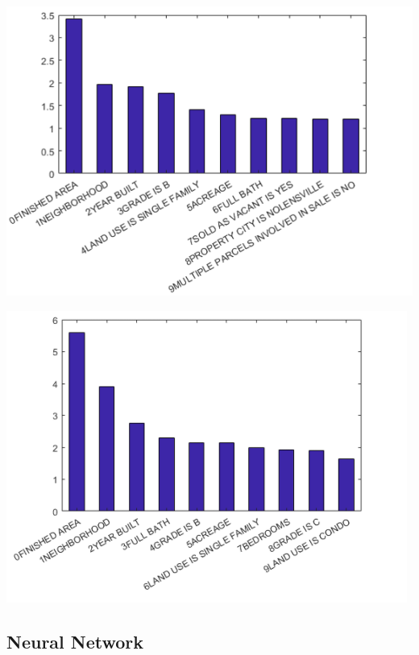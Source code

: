 \documentclass[10pt]{article}
\begin{document}
\begin{multicols}{2}
		\begin{center}
		\captionsetup{type=figure}
			\includegraphics[scale=0.60]{Images/BestFeaturesRegression} \\
			\label{fig:r_best_features}
		\end{center}

		\begin{center}
		\captionsetup{type=figure}
			\includegraphics[scale=0.60]{Images/BestFeaturesClassification} \\
			\label{fig:c_best_features}
		\end{center}

		\subsection{Neural Network}


\end{multicols}
\end{document}
